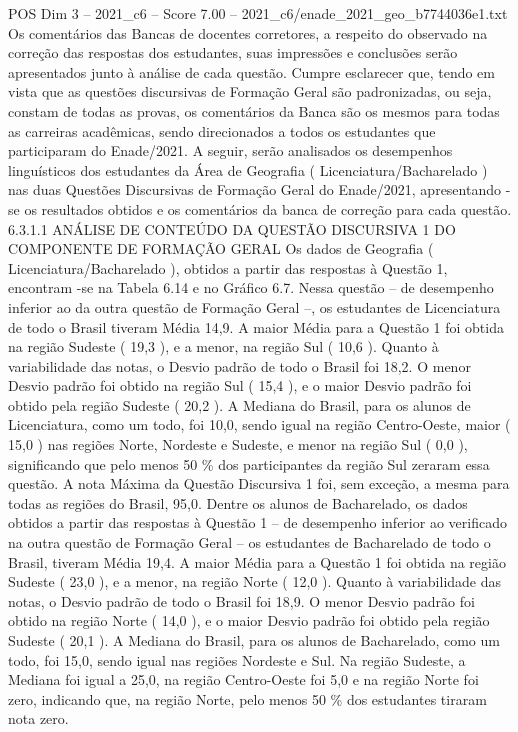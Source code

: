 \begin{textsample}{POS Dim 3 – 2021\_c6 – Score 7.00 – 2021\_c6/enade\_2021\_geo\_b7744036e1.txt}
Os comentários das Bancas de docentes corretores, a respeito do observado na correção das respostas dos estudantes, suas impressões e conclusões serão apresentados junto à análise de cada questão.
Cumpre esclarecer que, tendo em vista que as questões discursivas de Formação Geral são padronizadas, ou seja, constam de todas as provas, os comentários da Banca são os mesmos para todas as carreiras acadêmicas, sendo direcionados a todos os estudantes que participaram do Enade/2021.
A seguir, serão analisados os desempenhos linguísticos dos estudantes da Área de Geografia ( Licenciatura/Bacharelado ) nas duas Questões Discursivas de Formação Geral do Enade/2021, apresentando -se os resultados obtidos e os comentários da banca de correção para cada questão. 6.3.1.1 ANÁLISE DE CONTEÚDO DA QUESTÃO DISCURSIVA 1 DO COMPONENTE DE FORMAÇÃO GERAL Os dados de Geografia ( Licenciatura/Bacharelado ), obtidos a partir das respostas à Questão 1, encontram -se na Tabela 6.14 e no Gráfico 6.7.
Nessa questão – de desempenho inferior ao da outra questão de Formação Geral –, os estudantes de Licenciatura de todo o Brasil tiveram Média 14,9.
A maior Média para a Questão 1 foi obtida na região Sudeste ( 19,3 ), e a menor, na região Sul ( 10,6 ).
Quanto à variabilidade das notas, o Desvio padrão de todo o Brasil foi 18,2.
O menor Desvio padrão foi obtido na região Sul ( 15,4 ), e o maior Desvio padrão foi obtido pela região Sudeste ( 20,2 ).
A Mediana do Brasil, para os alunos de Licenciatura, como um todo, foi 10,0, sendo igual na região Centro-Oeste, maior ( 15,0 ) nas regiões Norte, Nordeste e Sudeste, e menor na região Sul ( 0,0 ), significando que pelo menos 50 \% dos participantes da região Sul zeraram essa questão.
A nota Máxima da Questão Discursiva 1 foi, sem exceção, a mesma para todas as regiões do Brasil, 95,0.
Dentre os alunos de Bacharelado, os dados obtidos a partir das respostas à Questão 1 – de desempenho inferior ao verificado na outra questão de Formação Geral – os estudantes de Bacharelado de todo o Brasil, tiveram Média 19,4.
A maior Média para a Questão 1 foi obtida na região Sudeste ( 23,0 ), e a menor, na região Norte ( 12,0 ).
Quanto à variabilidade das notas, o Desvio padrão de todo o Brasil foi 18,9.
O menor Desvio padrão foi obtido na região Norte ( 14,0 ), e o maior Desvio padrão foi obtido pela região Sudeste ( 20,1 ).
A Mediana do Brasil, para os alunos de Bacharelado, como um todo, foi 15,0, sendo igual nas regiões Nordeste e Sul.
Na região Sudeste, a Mediana foi igual a 25,0, na região Centro-Oeste foi 5,0 e na região Norte foi zero, indicando que, na região Norte, pelo menos 50 \% dos estudantes tiraram nota zero.

\end{textsample}
